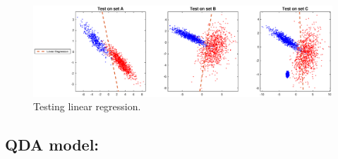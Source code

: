 \documentclass[a4paper,10pt]{article}
\theoremstyle{exostyle}
\begin{document}
\begin{figure}[!h]
\includegraphics[width=\textwidth]{classification_data_HWK1/classification_data_HWK1/linTest.eps} 
\caption{Testing linear regression.}
\end{figure}

\newpage
\subsection{QDA model:}
\end{document}
